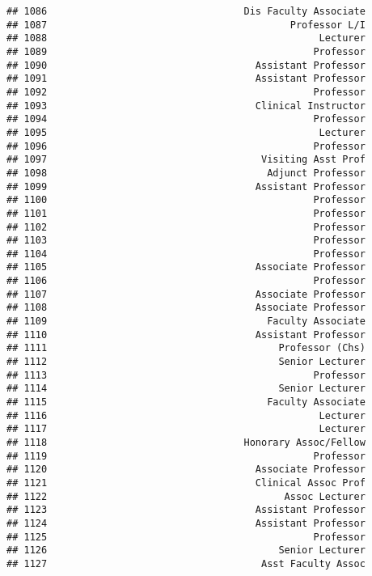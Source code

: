 \documentclass[
]{article}
\begin{document}
\begin{verbatim}
## 1086                                  Dis Faculty Associate
## 1087                                          Professor L/I
## 1088                                               Lecturer
## 1089                                              Professor
## 1090                                    Assistant Professor
## 1091                                    Assistant Professor
## 1092                                              Professor
## 1093                                    Clinical Instructor
## 1094                                              Professor
## 1095                                               Lecturer
## 1096                                              Professor
## 1097                                     Visiting Asst Prof
## 1098                                      Adjunct Professor
## 1099                                    Assistant Professor
## 1100                                              Professor
## 1101                                              Professor
## 1102                                              Professor
## 1103                                              Professor
## 1104                                              Professor
## 1105                                    Associate Professor
## 1106                                              Professor
## 1107                                    Associate Professor
## 1108                                    Associate Professor
## 1109                                      Faculty Associate
## 1110                                    Assistant Professor
## 1111                                        Professor (Chs)
## 1112                                        Senior Lecturer
## 1113                                              Professor
## 1114                                        Senior Lecturer
## 1115                                      Faculty Associate
## 1116                                               Lecturer
## 1117                                               Lecturer
## 1118                                  Honorary Assoc/Fellow
## 1119                                              Professor
## 1120                                    Associate Professor
## 1121                                    Clinical Assoc Prof
## 1122                                         Assoc Lecturer
## 1123                                    Assistant Professor
## 1124                                    Assistant Professor
## 1125                                              Professor
## 1126                                        Senior Lecturer
## 1127                                     Asst Faculty Assoc

\end{verbatim}
\end{document}
